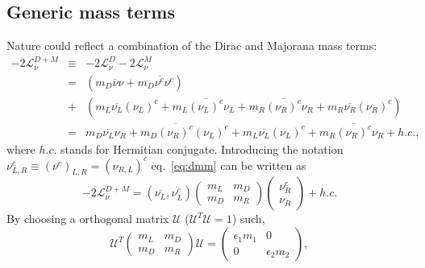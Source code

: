 \subsection{Generic mass terms}
\label{sec:genma}
Nature could reflect a combination of the Dirac and Majorana mass
terms:
\begin{equation}
\label{eq:dmm}
\begin{array}{ccl}
-2\mathcal{L}_{\nu}^{D+M} &\equiv& -2\mathcal{L}_{\nu}^{D} 
-2\mathcal{L}_{\nu}^{M}\\ &=& \displaystyle{( 
m_{D}\overline{\nu}\nu +
m_{D}\overline{\nu^{c}}\nu^{c} )}\\ &+& 
\displaystyle{(m_{L}\overline{\nu_{L}}(\nu_{L})^{c} +                         m_{L}\overline{(\nu_{L})^{c}}\nu_{L} +                   
m_{R}\overline{(\nu_{R})^{c}}\nu_{R} +                                      m_{R}\overline{\nu_{R}}(\nu_{R})^{c})}\\ &=&\displaystyle{
m_{D}\overline{\nu_{L}}\nu_{R} +
m_{D}\overline{(\nu_{R})^{c}}(\nu_{L})^{c} +
m_{L}\overline{\nu_{L}}(\nu_{L})^{c} + 
m_{R}\overline{(\nu_{R})^{c}}\nu_{R} + h.c.},
\end{array}
\end{equation}
where $h.c.$ stands for Hermitian conjugate. Introducing the notation
$\nu^{c}_{L,R} \equiv (\nu^{c})_{L,R} = (\nu_{R,L})^{c}$
eq.~\ref{eq:dmm} can be written as
\begin{equation}
\label{eq:mm}
-2\mathcal{L}_{\nu}^{D+M} =       
\left(\overline{\nu_{L}},\overline{\nu^{c}_{L}}\right)
\left(\begin{array}{cc}m_L & m_D \\ m_D & m_R\end{array}\right)
\left(\begin{array}{c}\nu^{c}_R \\ \nu_R\end{array}\right) + h.c.
\end{equation}
By choosing a orthogonal matrix $\mathcal{U}$ ($\mathcal{U}^{T}
\mathcal{U} = 1$) such,
\begin{equation}
\label{eq:mmat}
\mathcal{U}^{T}\left(\begin{array}{cc}m_L & m_D \\ m_D &       
m_R\end{array}\right)\mathcal{U} = 
\left(\begin{array}{cc}\epsilon_{1}m_1 & 0 \\ 0 &            
\epsilon_{2}m_2\end{array}\right),
\end{equation}
